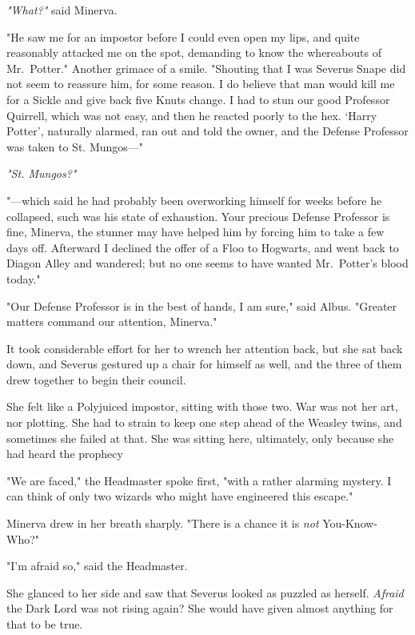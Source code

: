 \emph{"What?"} said Minerva.

"He saw me for an impostor before I could even open my lips, and quite
reasonably attacked me on the spot, demanding to know the whereabouts of
Mr.~Potter." Another grimace of a smile. "Shouting that I was Severus Snape did
not seem to reassure him, for some reason. I do believe that man would kill me
for a Sickle and give back five Knuts change. I had to stun our good Professor
Quirrell, which was not easy, and then he reacted poorly to the hex. `Harry
Potter', naturally alarmed, ran out and told the owner, and the Defense
Professor was taken to St. Mungos\mbox{---}"

\emph{"St. Mungos?"}

"---which said he had probably been overworking himself for weeks before he
collapsed, such was his state of exhaustion. Your precious Defense Professor is
fine, Minerva, the stunner may have helped him by forcing him to take a few
days off. Afterward I declined the offer of a Floo to Hogwarts, and went back
to Diagon Alley and wandered; but no one seems to have wanted Mr.~Potter's
blood today."

"Our Defense Professor is in the best of hands, I am sure," said Albus.
"Greater matters command our attention, Minerva."

It took considerable effort for her to wrench her attention back, but she sat
back down, and Severus gestured up a chair for himself as well, and the three
of them drew together to begin their council.

She felt like a Polyjuiced impostor, sitting with those two. War was not her
art, nor plotting. She had to strain to keep one step ahead of the Weasley
twins, and sometimes she failed at that. She was sitting here, ultimately, only
because she had heard the prophecy{\el}

"We are faced," the Headmaster spoke first, "with a rather alarming mystery. I
can think of only two wizards who might have engineered this escape."

Minerva drew in her breath sharply. "There is a chance it is \emph{not}
You-Know-Who?"

"I'm afraid so," said the Headmaster.

She glanced to her side and saw that Severus looked as puzzled as herself.
\emph{Afraid} the Dark Lord was not rising again? She would have given almost
anything for that to be true.


